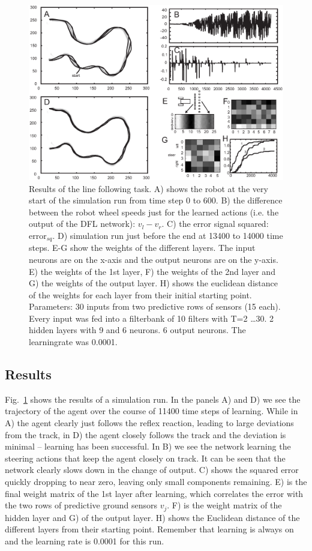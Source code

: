 \documentclass{llncs}
\begin{document}
\begin{figure}[h!]
  \centering
  \includegraphics[width=\columnwidth]{line_results}
  \caption{Results of the line following task. A) shows the robot at
    the very start of the simulation run from time step 0 to 600.  B)
    the difference between the robot wheel speeds just for the learned
    actions (i.e. the output of the DFL network): $v_l-v_r$.  C) the
    error signal squared: $\mathrm{error}_{sq}$.  D) simulation run
    just before the end at 13400 to 14000 time steps.  E-G show the
    weights of the different layers. The input neurons are on the
    x-axis and the output neurons are on the y-axis.  E) the weights
    of the 1st layer, F) the weights of the 2nd layer and G) the
    weights of the output layer.  H) shows the euclidean distance of
    the weights for each layer from their initial starting
    point. Parameters: 30 inputs from two predictive rows of sensors
    (15 each). Every input was fed into a filterbank of 10 filters
    with T=2 \ldots 30. 2 hidden layers with 9 and 6 neurons. 6 output
    neurons. The learningrate was 0.0001.
    \label{line_results}}
\end{figure}



\subsection{Results}
Fig.~\ref{line_results} shows the results of a simulation run. In the
panels A) and D) we see the trajectory of the agent over the course of
11400 time steps of learning. While in A) the agent clearly just
follows the reflex reaction, leading to large deviations from the
track, in D) the agent closely follows the track and the deviation is
minimal -- learning has been successful. In B) we see the network
learning the steering actions that keep the agent closely on track.
It can be seen that the network clearly slows down in the change of
output.  C) shows the squared error quickly dropping to near zero,
leaving only small components remaining. E) is the final weight matrix
of the 1st layer after learning, which correlates the error with the
two rows of predictive ground sensors $v_j$. F) is the weight matrix
of the hidden layer and G) of the output layer. H) shows the Euclidean
distance of the different layers from their starting point. Remember
that learning is always on and the learning rate is 0.0001 for this
run.
\end{document}
